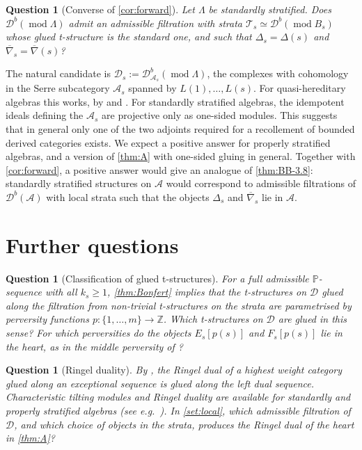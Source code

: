 \documentclass[11pt,reqno]{amsart}
\theoremstyle{plain}
\newtheorem{question}[theorem]{Question}
\theoremstyle{definition}
\theoremstyle{remark}
\newcommand{\modd}{\operatorname{mod}}
\newcommand{\Db}{\mathcal{D}^b}
\newcommand{\nablabar}{\overline{\nabla}}
\newcommand{\cD}{\mathcal{D}}
\newcommand{\cA}{\mathcal{A}}
\newcommand{\cT}{\mathcal{T}}
\begin{document}
\begin{question}[Converse of \cref{cor:forward}]\label{q:converse}
Let $\Lambda$ be standardly stratified. Does $\Db(\modd\Lambda)$ admit an admissible filtration with strata $\cT_s\simeq\Db(\modd B_s)$ whose glued t-structure is the standard one, and such that $\Delta_s=\Delta(s)$ and $\nablabar_s=\nablabar(s)$?
\end{question}

The natural candidate is $\cD_s:=\Db_{\cA_s}(\modd\Lambda)$, the complexes with cohomology in the Serre subcategory $\cA_s$ spanned by $L(1),\dots,L(s)$. For quasi-hereditary algebras this works, by \cite{CPS88} and \cite[Cor.~3.6]{BB26}. For standardly stratified algebras, the idempotent ideals defining the $\cA_s$ are projective only as one-sided modules. This suggests that in general only one of the two adjoints required for a recollement of bounded derived categories exists. We expect a positive answer for properly stratified algebras, and a version of \cref{thm:A} with one-sided gluing in general. Together with \cref{cor:forward}, a positive answer would give an analogue of \cref{thm:BB-3.8}: standardly stratified structures on $\cA$ would correspond to admissible filtrations of $\Db(\cA)$ with local strata such that the objects $\Delta_s$ and $\nablabar_s$ lie in $\cA$.

\section{Further questions}\label{sec:questions}

\begin{question}[Classification of glued t-structures]\label{q:classification}
For a full admissible $\mathbb{P}$-sequence with all $k_s\ge1$, \cref{thm:Bonfert} implies that the t-structures on $\cD$ glued along the filtration from non-trivial t-structures on the strata are parametrised by perversity functions $p\colon\{1,\dots,m\}\to\mathbb{Z}$. Which t-structures on $\cD$ are glued in this sense? For which perversities do the objects $E_s[p(s)]$ and $F_s[p(s)]$ lie in the heart, as in the middle perversity of \cite[\S5.1]{BB26}?
\end{question}

\begin{question}[Ringel duality]
By \cite[Thm.~3.2]{BB26}, the Ringel dual of a highest weight category glued along an exceptional sequence is glued along the left dual sequence. Characteristic tilting modules and Ringel duality are available for standardly and properly stratified algebras (see e.g.\ \cite{AHLU00}). In \cref{set:local}, which admissible filtration of $\cD$, and which choice of objects in the strata, produces the Ringel dual of the heart in \cref{thm:A}?
\end{question}
\end{document}
